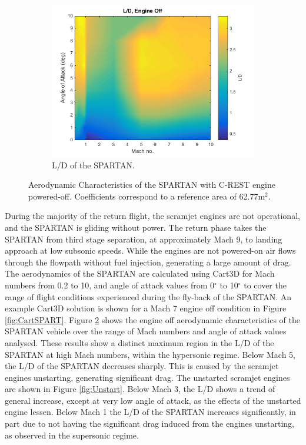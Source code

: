 \begin{figure}[ht]
\begin{subfigure}{.5\textwidth}
		\includegraphics[width=0.99\linewidth]{figures/3_vehicle_design/LD}
		\caption{L/D of the SPARTAN.}
		\label{fig:LD}
	\end{subfigure}
	\caption{Aerodynamic Characteristics of the SPARTAN with C-REST engine powered-off. Coefficients correspond to a reference area of 62.77m$^2$.}
	\label{fig:aero1}
\end{figure}

During the majority of the return flight, the scramjet engines are not operational, and the SPARTAN is gliding without power. The return phase takes the SPARTAN from third stage separation, at approximately Mach 9, to landing approach at low subsonic speeds. 
 While the engines are not powered-on air flows through the flowpath without fuel injection, generating a large amount of drag. 
The aerodynamics of the SPARTAN are calculated using Cart3D for Mach numbers from 0.2 to 10, and angle of attack values from 0$^\circ$ to 10$^\circ$ to cover the range of flight conditions experienced during the fly-back of the SPARTAN.  An example Cart3D solution is shown for a Mach 7 engine off condition in Figure  \ref{fig:CartSPART}. 
Figure \ref{fig:aero1} shows the engine off aerodynamic characteristics of the SPARTAN vehicle over the range of Mach numbers and angle of attack values analysed.
These results show a distinct maximum region in the L/D of the SPARTAN at high Mach numbers, within the hypersonic regime. Below Mach 5, the L/D of the SPARTAN decreases sharply. This is caused by the scramjet engines unstarting, generating significant drag. The unstarted scramjet engines are shown in Figure \ref{fig:Unstart}. Below Mach 3,  the L/D shows a trend of general increase, except at very low angle of attack, as the effects of the unstarted engine lessen. Below Mach 1 the L/D of the SPARTAN increases significantly, in part due to not having the significant drag induced from the engines unstarting, as observed in the supersonic regime.  

